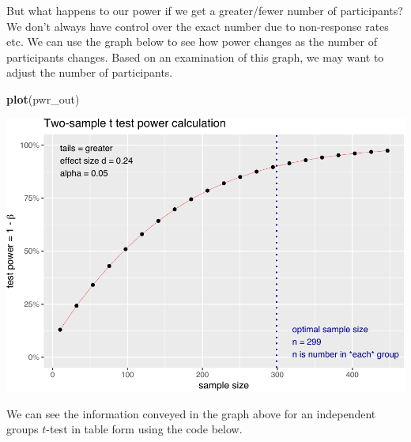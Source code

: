 \documentclass[
]{krantz}
\makeatletter
\newenvironment{Shaded}{\begin{snugshade}}{\end{snugshade}}
\newcommand{\KeywordTok}[1]{\textcolor[rgb]{0.27,0.27,0.27}{\textbf{#1}}}
\newcommand{\NormalTok}[1]{#1}
\newenvironment{kframe}{%
\medskip{}
\setlength{\fboxsep}{.8em}
 \def\at@end@of@kframe{}%
 \ifinner\ifhmode%
  \def\at@end@of@kframe{\end{minipage}}%
  \begin{minipage}{\columnwidth}%
 \fi\fi%
 \def\FrameCommand##1{\hskip\@totalleftmargin \hskip-\fboxsep
 \colorbox{shadecolor}{##1}\hskip-\fboxsep
     \hskip-\linewidth \hskip-\@totalleftmargin \hskip\columnwidth}%
 \MakeFramed {\advance\hsize-\width
   \@totalleftmargin\z@ \linewidth\hsize
   \@setminipage}}%
 {\par\unskip\endMakeFramed%
 \at@end@of@kframe}
\renewenvironment{Shaded}{\begin{kframe}}{\end{kframe}}
\makeatother
\begin{document}
But what happens to our power if we get a greater/fewer number of participants? We don't always have control over the exact number due to non-response rates etc. We can use the graph below to see how power changes as the number of participants changes. Based on an examination of this graph, we may want to adjust the number of participants.

\begin{Shaded}
\begin{Highlighting}[]
\KeywordTok{plot}\NormalTok{(pwr_out)}
\end{Highlighting}
\end{Shaded}

\includegraphics{bookdown_files/figure-latex/unnamed-chunk-238-1.pdf}

We can see the information conveyed in the graph above for an independent groups \(t\)-test in table form using the code below.
\end{document}
